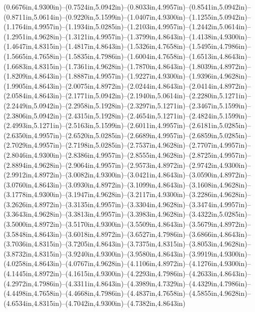 (0.6676in,4.9300in)--(0.7524in,5.0942in)--(0.8033in,4.9957in)--(0.8541in,5.0942in)--(0.8711in,5.0614in)--(0.9220in,5.1599in)--(1.0407in,4.9300in)--(1.1255in,5.0942in)--(1.1764in,4.9957in)--(1.1934in,5.0285in)--(1.2103in,4.9957in)--(1.2442in,5.0614in)--(1.2951in,4.9628in)--(1.3121in,4.9957in)--(1.3799in,4.8643in)--(1.4138in,4.9300in)--(1.4647in,4.8315in)--(1.4817in,4.8643in)--(1.5326in,4.7658in)--(1.5495in,4.7986in)--(1.5665in,4.7658in)--(1.5835in,4.7986in)--(1.6004in,4.7658in)--(1.6513in,4.8643in)--(1.6683in,4.8315in)--(1.7361in,4.9628in)--(1.7870in,4.8643in)--(1.8039in,4.8972in)--(1.8209in,4.8643in)--(1.8887in,4.9957in)--(1.9227in,4.9300in)--(1.9396in,4.9628in)--(1.9905in,4.8643in)--(2.0075in,4.8972in)--(2.0244in,4.8643in)--(2.0414in,4.8972in)--(2.0584in,4.8643in)--(2.1771in,5.0942in)--(2.1940in,5.0614in)--(2.2280in,5.1271in)--(2.2449in,5.0942in)--(2.2958in,5.1928in)--(2.3297in,5.1271in)--(2.3467in,5.1599in)--(2.3806in,5.0942in)--(2.4315in,5.1928in)--(2.4654in,5.1271in)--(2.4824in,5.1599in)--(2.4993in,5.1271in)--(2.5163in,5.1599in)--(2.6011in,4.9957in)--(2.6181in,5.0285in)--(2.6350in,4.9957in)--(2.6520in,5.0285in)--(2.6689in,4.9957in)--(2.6859in,5.0285in)--(2.7029in,4.9957in)--(2.7198in,5.0285in)--(2.7537in,4.9628in)--(2.7707in,4.9957in)--(2.8046in,4.9300in)--(2.8386in,4.9957in)--(2.8555in,4.9628in)--(2.8725in,4.9957in)--(2.8894in,4.9628in)--(2.9064in,4.9957in)--(2.9573in,4.8972in)--(2.9742in,4.9300in)--(2.9912in,4.8972in)--(3.0082in,4.9300in)--(3.0421in,4.8643in)--(3.0590in,4.8972in)--(3.0760in,4.8643in)--(3.0930in,4.8972in)--(3.1099in,4.8643in)--(3.1608in,4.9628in)--(3.1778in,4.9300in)--(3.1947in,4.9628in)--(3.2117in,4.9300in)--(3.2286in,4.9628in)--(3.2626in,4.8972in)--(3.3135in,4.9957in)--(3.3304in,4.9628in)--(3.3474in,4.9957in)--(3.3643in,4.9628in)--(3.3813in,4.9957in)--(3.3983in,4.9628in)--(3.4322in,5.0285in)--(3.5000in,4.8972in)--(3.5170in,4.9300in)--(3.5509in,4.8643in)--(3.5679in,4.8972in)--(3.5848in,4.8643in)--(3.6018in,4.8972in)--(3.6527in,4.7986in)--(3.6866in,4.8643in)--(3.7036in,4.8315in)--(3.7205in,4.8643in)--(3.7375in,4.8315in)--(3.8053in,4.9628in)--(3.8732in,4.8315in)--(3.9240in,4.9300in)--(3.9580in,4.8643in)--(3.9919in,4.9300in)--(4.0258in,4.8643in)--(4.0767in,4.9628in)--(4.1106in,4.8972in)--(4.1276in,4.9300in)--(4.1445in,4.8972in)--(4.1615in,4.9300in)--(4.2293in,4.7986in)--(4.2633in,4.8643in)--(4.2972in,4.7986in)--(4.3311in,4.8643in)--(4.3989in,4.7329in)--(4.4329in,4.7986in)--(4.4498in,4.7658in)--(4.4668in,4.7986in)--(4.4837in,4.7658in)--(4.5855in,4.9628in)--(4.6534in,4.8315in)--(4.7042in,4.9300in)--(4.7382in,4.8643in) 